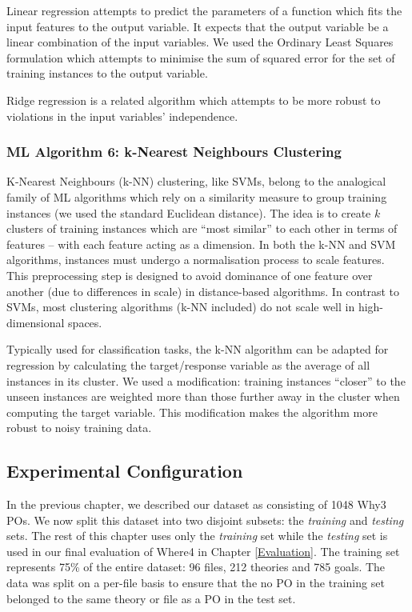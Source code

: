 Linear regression attempts to predict the parameters of a function which fits the input features to the output variable. 
It expects that the output variable be a linear combination of the input variables.
We used the Ordinary Least Squares formulation which attempts to minimise the sum of squared error for the set of training instances to the output variable.    

Ridge regression \cite{ridge} is a related algorithm which attempts to be more robust to violations in the input variables' independence. 

\subsubsection{ML Algorithm 6: k-Nearest Neighbours Clustering}

K-Nearest Neighbours (k-NN) clustering, like SVMs, belong to the analogical family of ML algorithms which rely on a similarity measure to group training instances (we used the standard Euclidean distance).
The idea is to create $k$ clusters of training instances which are ``most similar'' to each other in terms of features -- with each feature acting as a dimension.   
In both the k-NN and SVM algorithms, instances must undergo a normalisation process to scale features.  
This preprocessing step is designed to avoid dominance of one feature over another (due to differences in scale) in distance-based algorithms.
In contrast to SVMs, most clustering algorithms (k-NN included) do not scale well in high-dimensional spaces.

\sloppypar
Typically used for classification tasks, the k-NN algorithm can be adapted for regression by calculating the target/response variable as the average of all instances in its cluster.
We used a modification: training instances ``closer'' to the unseen instances are weighted more than those further away in the cluster when computing the target variable.
This modification makes the algorithm more robust to noisy training data. 

\subsection{Experimental Configuration}
\label{sub:config}

In the previous chapter, we described our dataset as consisting of 1048 \textsf{Why3} POs.
We now split this dataset into two disjoint subsets: the \textit{training} and \textit{testing} sets. 
The rest of this chapter uses only the \textit{training} set while the \textit{testing} set is used in our final evaluation of \textsf{Where4} in Chapter \ref{Evaluation}.
The training set represents 75\% of the entire dataset: 96 files,   212 theories and 785 goals. 
The data was split on a per-file basis to ensure that the no PO in the training set belonged to the same theory or file as a PO in the test set. 

